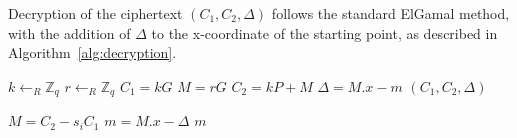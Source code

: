 \documentclass[runningheads]{llncs}
\begin{document}
Decryption of the ciphertext $(C_1, C_2, \Delta)$ follows the standard ElGamal method, with the addition of $\Delta$ to the x-coordinate of the starting point, as described in Algorithm~\ref{alg:decryption}.

\begin{algorithm}
    \caption{$\texttt{Enc}_{P_i}$}
    \label{alg:encryption}
    
    
    $k \gets_R \mathbb{Z}_q$\;
    $r \gets_R \mathbb{Z}_q$\;
    $C_1 = kG$\;
    $M = rG$\;
    $C_2 = kP + M$\;
    $\Delta = M.x - m$\;
    \Return $(C_1, C_2, \Delta)$
\end{algorithm}

\begin{algorithm}
    \caption{$\texttt{Dec}_{s_i}$}
    \label{alg:decryption}
    
    
    $M = C_2 - s_i C_1$\;
    $m = M.x - \Delta$\;
    \Return $m$
\end{algorithm}
\end{document}
